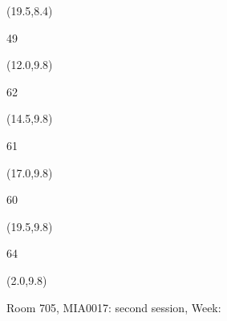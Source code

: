 \documentclass[a4paper]{article}
\newcommand{\myseat}[4]{%
\vspace{-0.1cm} \hspace{-0.5cm}
\parbox[t][2.2cm][t]{3.5cm}{%
\small #1 %
\begin{description}
\vspace{-0.1cm}
\item [ID:] #2
\vspace{-0.1cm}
\item [Team:] #3 \normalsize
\vspace{-0.1cm}
\item \normalsize #4
\vspace{-0.1cm}
\end{description}
}
}
\begin{document}
\begin{CJK}{UTF8}{cyberbit}
\begin{textblock}{2.5}(19.5,8.4)
\textblockcolor{}
\myseat{49}{}{}{}
\end{textblock}


\begin{textblock}{2.5}(12.0,9.8)
\textblockcolor{}
\myseat{62}{}{}{}
\end{textblock}

\begin{textblock}{2.5}(14.5,9.8)
\textblockcolor{}
\myseat{61}{}{}{}
\end{textblock}

\begin{textblock}{2.5}(17.0,9.8)
\textblockcolor{}
\myseat{60}{}{}{}
\end{textblock}

\begin{textblock}{2.5}(19.5,9.8)
\textblockcolor{}
\myseat{64}{}{}{}
\end{textblock}

\begin{textblock}{10}(2.0,9.8)
\textblockcolor{}
\parbox[t][2.2cm][t]{9.5cm}{%
\large Room 705, MIA0017: second session, Week: 
\vspace{-0.3cm} \hspace{-0.5cm}
}
\end{textblock}

\end{CJK}
\end{document}
